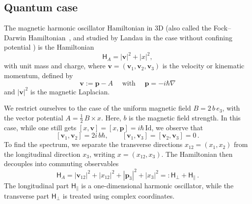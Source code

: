 \documentclass[11pt]{amsart}
\theoremstyle{plain}
\theoremstyle{definition}
\newcommand		\sfH		{\mathsf H}			%
\newcommand		{\lt}			{\left}				%
\newcommand		{\rt}			{\right}			%
\renewcommand	{\(}			{\lt(}
\renewcommand	{\)}			{\rt)}
\newcommand		{\com}[1]		{\lt[{#1}\rt]}		%
\newcommand		{\n}[1]			{\lt\lvert #1 \rt\rvert}
\newcommand			{\bd}		{\partial}
\newcommand			{\Id}		{\mathrm{Id}}		%
\DeclareMathOperator{\curl}		{curl}				%
\newcommand		{\opv}		{{\boldsymbol{v}}}
\newcommand		{\opp}		{\boldsymbol{p}}
\newcommand		{\opvmag}	{\opv} 	%
\begin{document}
	
\subsection{Quantum case}\label{sec:withMagnet-quantum}

	The magnetic harmonic oscillator Hamiltonian in 3D (also called the Fock--Darwin Hamiltonian~\cite{fock_bemerkung_1928, darwin_diamagnetism_1931}, and studied by Landau in the case without confining potential \cite{landau_diamagnetismus_1930, landau_quantum_1991}) is the Hamiltonian
	\begin{equation*}
		\sfH_A = \n{\opvmag}^2 + \n{x}^2 ,
	\end{equation*}
    with unit mass and charge, 
	where $\opvmag = (\opvmag_1, \opvmag_2, \opvmag_3)$ is the velocity or kinematic momentum, defined by
	\begin{equation*}
		\opvmag := \opp - A \quad \text{ with } \quad \opp = -i\hbar\nabla  %
	\end{equation*}
	and $\n{\opvmag}^2$ is the magnetic Laplacian.
	

	We restrict ourselves to the case of the uniform magnetic field $B = 2\,b\, e_3$, with the vector potential $A = \tfrac12 \,B\times x$. Here, $b$ is the magnetic field strength.
	In this case, while one still gets $\com{x,\opv} = \com{x,\opp} = i\hbar \,\Id$, we observe that
	\begin{equation*}
		\com{\opvmag_1, \opvmag_2}= 2i\,b\hbar, \qquad \com{\opvmag_1, \opvmag_3}= \com{\opvmag_2, \opvmag_3}= 0\,.
	\end{equation*}
	To find the spectrum, we separate the transverse directions $x_{12}=(x_1, x_2)$ from the longitudinal direction $x_3$, writing $x = (x_{12}, x_3)$. The Hamiltonian then decouples into commuting observables 
	\begin{equation*}
		\sfH_A = \n{\opvmag_{12}}^2+ \n{x_{12}}^2+ \n{\opp_3}^2+ \n{x_3}^2 =: \sfH_{\perp} +\sfH_{\parallel}\,.
	\end{equation*}
	The longitudinal part $\sfH_{\parallel}$ is a one-dimensional harmonic oscillator, while the transverse part $\sfH_{\perp}$ is treated using complex coordinates.
	
\end{document}
